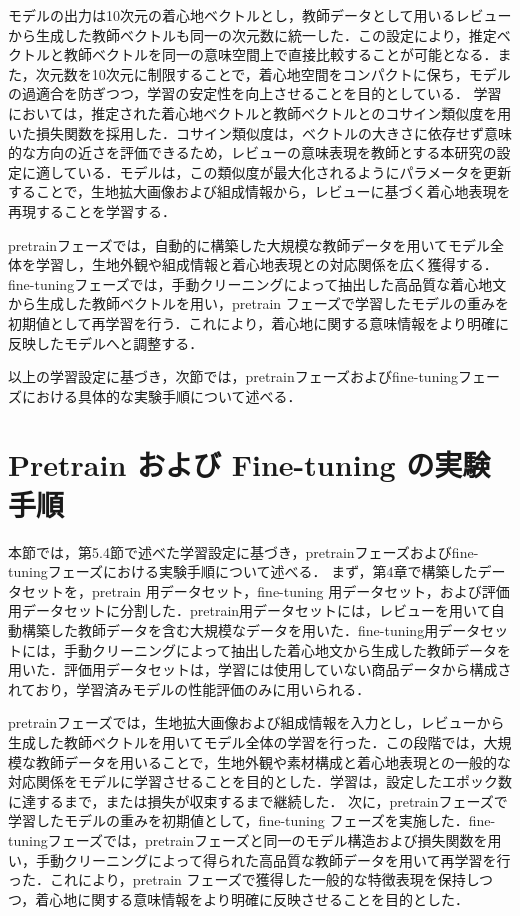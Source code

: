 \documentclass[a4paper,12pt]{jreport}
\begin{document}
モデルの出力は10次元の着心地ベクトルとし，教師データとして用いるレビューから生成した教師ベクトルも同一の次元数に統一した．この設定により，推定ベクトルと教師ベクトルを同一の意味空間上で直接比較することが可能となる．また，次元数を10次元に制限することで，着心地空間をコンパクトに保ち，モデルの過適合を防ぎつつ，学習の安定性を向上させることを目的としている．
学習においては，推定された着心地ベクトルと教師ベクトルとのコサイン類似度を用いた損失関数を採用した．コサイン類似度は，ベクトルの大きさに依存せず意味的な方向の近さを評価できるため，レビューの意味表現を教師とする本研究の設定に適している．モデルは，この類似度が最大化されるようにパラメータを更新することで，生地拡大画像および組成情報から，レビューに基づく着心地表現を再現することを学習する．

pretrainフェーズでは，自動的に構築した大規模な教師データを用いてモデル全体を学習し，生地外観や組成情報と着心地表現との対応関係を広く獲得する．fine-tuningフェーズでは，手動クリーニングによって抽出した高品質な着心地文から生成した教師ベクトルを用い，pretrain フェーズで学習したモデルの重みを初期値として再学習を行う．これにより，着心地に関する意味情報をより明確に反映したモデルへと調整する．

以上の学習設定に基づき，次節では，pretrainフェーズおよびfine-tuningフェーズにおける具体的な実験手順について述べる．

\section{Pretrain および Fine-tuning の実験手順}
本節では，第5.4節で述べた学習設定に基づき，pretrainフェーズおよびfine-tuningフェーズにおける実験手順について述べる．
まず，第4章で構築したデータセットを，pretrain 用データセット，fine-tuning 用データセット，および評価用データセットに分割した．pretrain用データセットには，レビューを用いて自動構築した教師データを含む大規模なデータを用いた．fine-tuning用データセットには，手動クリーニングによって抽出した着心地文から生成した教師データを用いた．評価用データセットは，学習には使用していない商品データから構成されており，学習済みモデルの性能評価のみに用いられる．

pretrainフェーズでは，生地拡大画像および組成情報を入力とし，レビューから生成した教師ベクトルを用いてモデル全体の学習を行った．この段階では，大規模な教師データを用いることで，生地外観や素材構成と着心地表現との一般的な対応関係をモデルに学習させることを目的とした．学習は，設定したエポック数に達するまで，または損失が収束するまで継続した．
次に，pretrainフェーズで学習したモデルの重みを初期値として，fine-tuning フェーズを実施した．fine-tuningフェーズでは，pretrainフェーズと同一のモデル構造および損失関数を用い，手動クリーニングによって得られた高品質な教師データを用いて再学習を行った．これにより，pretrain フェーズで獲得した一般的な特徴表現を保持しつつ，着心地に関する意味情報をより明確に反映させることを目的とした．
\end{document}

